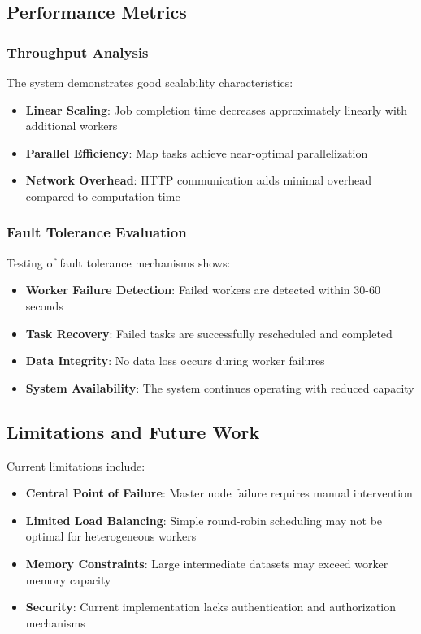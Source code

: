 \documentclass[11pt,letterpaper,oneside]{article}
\begin{document}
\subsection{Performance Metrics}

\subsubsection{Throughput Analysis}

The system demonstrates good scalability characteristics:

\begin{itemize}
    \item \textbf{Linear Scaling}: Job completion time decreases approximately linearly with additional workers
    \item \textbf{Parallel Efficiency}: Map tasks achieve near-optimal parallelization
    \item \textbf{Network Overhead}: HTTP communication adds minimal overhead compared to computation time
\end{itemize}

\subsubsection{Fault Tolerance Evaluation}

Testing of fault tolerance mechanisms shows:

\begin{itemize}
    \item \textbf{Worker Failure Detection}: Failed workers are detected within 30-60 seconds
    \item \textbf{Task Recovery}: Failed tasks are successfully rescheduled and completed
    \item \textbf{Data Integrity}: No data loss occurs during worker failures
    \item \textbf{System Availability}: The system continues operating with reduced capacity
\end{itemize}

\subsection{Limitations and Future Work}

Current limitations include:

\begin{itemize}
    \item \textbf{Central Point of Failure}: Master node failure requires manual intervention
    \item \textbf{Limited Load Balancing}: Simple round-robin scheduling may not be optimal for heterogeneous workers
    \item \textbf{Memory Constraints}: Large intermediate datasets may exceed worker memory capacity
    \item \textbf{Security}: Current implementation lacks authentication and authorization mechanisms
\end{itemize}
\end{document}
